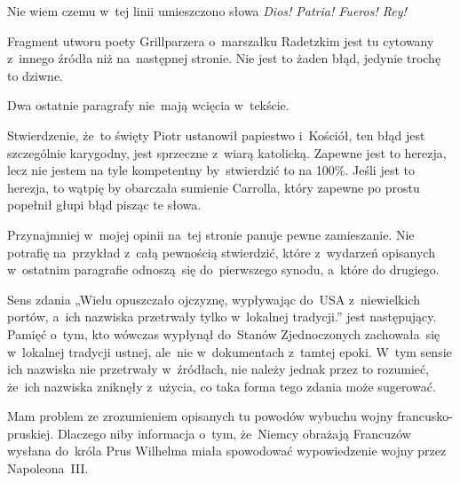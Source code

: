 \documentclass[a4paper,11pt]{article}
\numberwithin{equation}{section}
\begin{document}
\noindent
{} Nie wiem czemu w~tej linii umieszczono słowa
\textit{Dios! Patria! Fueros! Rey!}

\VerSpaceFour





\noindent
{} Fragment utworu poety Grillparzera o~marszałku Radetzkim jest tu
cytowany z~innego źródła niż na~następnej stronie. Nie jest to żaden błąd,
jedynie trochę to dziwne.

\VerSpaceFour





\noindent
{} Dwa ostatnie paragrafy nie~mają wcięcia w~tekście.

\VerSpaceFour





\noindent
{} Stwierdzenie, że~to święty Piotr ustanowił papiestwo i~Kościół,
ten błąd jest szczególnie karygodny, jest sprzeczne z~wiarą katolicką.
Zapewne jest to herezja, lecz nie jestem na tyle kompetentny by~stwierdzić
to na 100\%. Jeśli jest to herezja, to wątpię by obarczała sumienie
Carrolla, który zapewne po prostu popełnił głupi błąd pisząc te słowa.

\VerSpaceFour





\noindent
{} Przynajmniej w~mojej opinii na~tej stronie panuje pewne
zamieszanie. Nie potrafię na~przykład z~całą pewnością
stwierdzić, które z~wydarzeń opisanych w~ostatnim paragrafie
odnoszą~się do~pierwszego synodu, a~które do drugiego.

\VerSpaceFour





\noindent
{} Sens zdania „Wielu opuszczało ojczyznę, wypływając
do~USA z~niewielkich portów, a~ich nazwiska przetrwały tylko w~lokalnej
tradycji.” jest następujący. Pamięć o~tym, kto wówczas wypłynął do~Stanów
Zjednoczonych zachowała~się w~lokalnej tradycji ustnej, ale~nie
w~dokumentach z~tamtej epoki. W~tym sensie ich nazwiska nie przetrwały
w~źródłach, nie należy jednak przez to rozumieć, że~ich nazwiska zniknęły
z~użycia, co taka forma tego zdania może sugerować.

\VerSpaceFour





\noindent
{} Mam problem ze zrozumieniem opisanych tu powodów wybuchu wojny
francusko-pruskiej. Dlaczego niby informacja o~tym, że~Niemcy obrażają
Francuzów wysłana do~króla Prus Wilhelma miała spowodować wypowiedzenie
wojny przez Napoleona~III.
\end{document}
